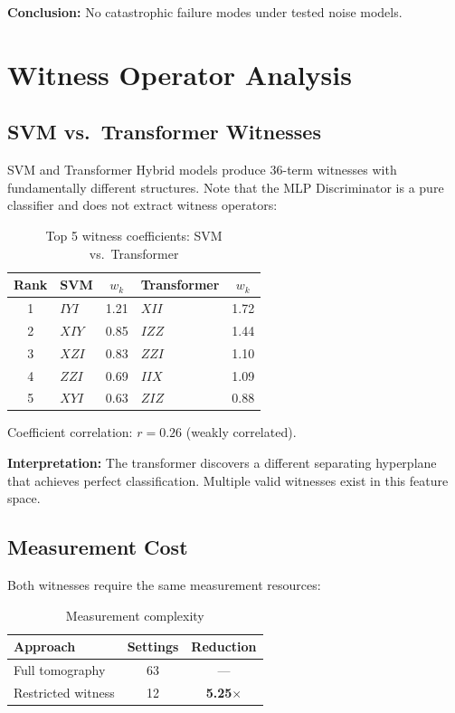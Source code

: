 \documentclass[11pt,a4paper]{article}
\begin{document}
\textbf{Conclusion:} No catastrophic failure modes under tested noise models.

\section{Witness Operator Analysis}

\subsection{SVM vs.\ Transformer Witnesses}

SVM and Transformer Hybrid models produce 36-term witnesses with fundamentally different structures. Note that the MLP Discriminator is a pure classifier and does not extract witness operators:

\begin{table}[h]
\centering
\caption{Top 5 witness coefficients: SVM vs.\ Transformer}
\begin{tabular}{clc|lc}
\toprule
\textbf{Rank} & \textbf{SVM} & \textbf{$w_k$} & \textbf{Transformer} & \textbf{$w_k$} \\
\midrule
1 & $IYI$ & 1.21 & $XII$ & 1.72 \\
2 & $XIY$ & 0.85 & $IZZ$ & 1.44 \\
3 & $XZI$ & 0.83 & $ZZI$ & 1.10 \\
4 & $ZZI$ & 0.69 & $IIX$ & 1.09 \\
5 & $XYI$ & 0.63 & $ZIZ$ & 0.88 \\
\bottomrule
\end{tabular}
\end{table}

Coefficient correlation: $r = 0.26$ (weakly correlated).

\textbf{Interpretation:} The transformer discovers a different separating hyperplane that achieves perfect classification. Multiple valid witnesses exist in this feature space.

\subsection{Measurement Cost}

Both witnesses require the same measurement resources:

\begin{table}[h]
\centering
\caption{Measurement complexity}
\begin{tabular}{lcc}
\toprule
\textbf{Approach} & \textbf{Settings} & \textbf{Reduction} \\
\midrule
Full tomography & 63 & --- \\
Restricted witness & 12 & \textbf{5.25$\times$} \\
\bottomrule
\end{tabular}
\end{table}
\end{document}
